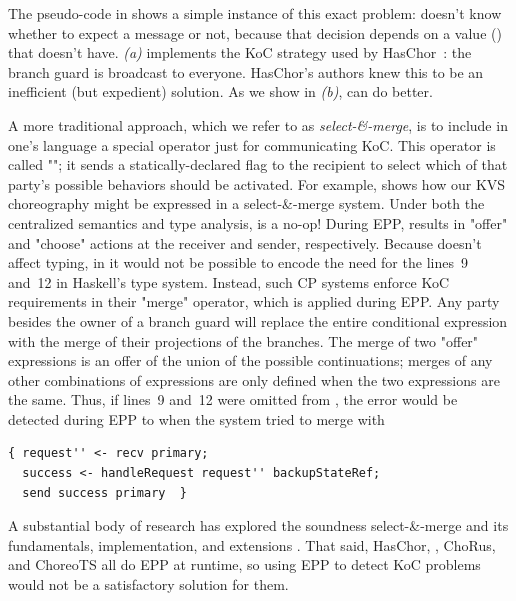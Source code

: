 The pseudo-code in  shows a simple instance of this exact problem:
 doesn't know whether to expect a message or not,
because that decision depends on a value () that  doesn't have.
\emph{(a)} implements the KoC strategy used by HasChor~\cite{shen-haschor}: the branch guard is broadcast to everyone.
HasChor's authors knew this to be an inefficient (but expedient) solution.
As we show in \emph{(b)}, \MultiChor can do better.

A more traditional approach,
which we refer to as \emph{select-\&-merge},
is to include in one's language a special operator just for communicating KoC.
This operator is called ""; it sends a statically-declared flag
to the recipient to select which of that party's possible behaviors should be activated.
For example,  shows how our KVS choreography might be expressed in a select-\&-merge system.
Under both the centralized semantics and type analysis,  is a no-op!
During EPP,  results in "offer" and "choose" actions at the receiver and sender, respectively.
Because  doesn't affect typing,
in  it would not be possible to encode the need for the lines~9 and~12 in Haskell's type system.
Instead, such CP systems enforce KoC requirements in their "merge" operator, which is applied during EPP.
Any party besides the owner of a branch guard will replace the entire conditional expression with the merge of their projections of the branches.
The merge of two "offer" expressions is an offer of the union of the possible continuations;
merges of any other combinations of expressions are only defined when the two expressions are the same.
Thus, if lines~9 and~12 were omitted from , the error would be detected during EPP to 
when the system tried to merge \inlinecode{{}} with
\begin{verbatim}
{ request'' <- recv primary;
  success <- handleRequest request'' backupStateRef;
  send success primary  }
\end{verbatim}
A substantial body of research has explored the soundness select-\&-merge
and its fundamentals, implementation, and extensions
\cite{montesi-carbone-dfbd,core_choreographies,giallorenzo-choral,robust_choreographies}.
That said, HasChor, \MultiChor, ChoRus, and ChoreoTS all do EPP at runtime\cite{batesenclaves},
so using EPP to detect KoC problems would not be a satisfactory solution for them.

